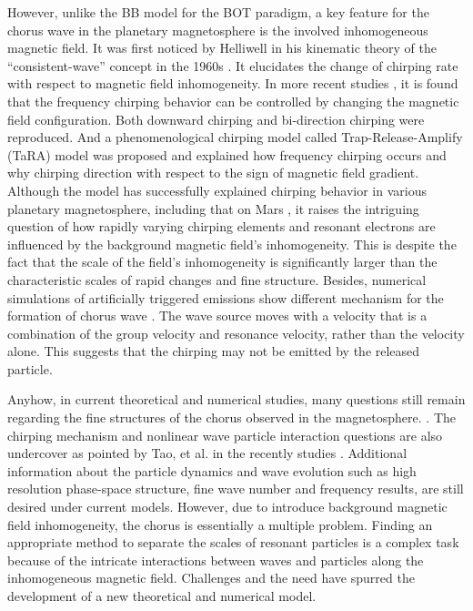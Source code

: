 However, unlike the BB model for the BOT paradigm, a key feature for the chorus wave in the planetary magnetosphere is the involved inhomogeneous magnetic field. 
It was first noticed by Helliwell in his kinematic theory of the ``consistent-wave'' concept in the 1960s \cite{helliwell_theory_1967}.
It elucidates the change of chirping rate with respect to magnetic field inhomogeneity.
In more recent studies \cite{wu_controlling_2020,fujiwara2023}, it is found that the frequency chirping behavior can be controlled by changing the magnetic field configuration. Both downward chirping and bi-direction chirping were reproduced.
And a phenomenological chirping model called Trap-Release-Amplify (TaRA) model was proposed and explained how frequency chirping occurs and why chirping direction with respect to the sign of magnetic field gradient.
Although the model has successfully explained chirping behavior in various planetary magnetosphere, including that on Mars \cite{teng2023}, it raises the intriguing question of how rapidly varying chirping elements and resonant electrons are influenced by the background magnetic field's inhomogeneity. This is despite the fact that the scale of the field's inhomogeneity is significantly larger than the characteristic scales of rapid changes and fine structure.
Besides, numerical simulations of artificially triggered emissions show different mechanism for the formation of chorus wave \cite{nogi2022,nogi2023}. 
The wave source moves with a velocity that is a combination of the group velocity and resonance velocity, rather than the velocity alone. This suggests that the chirping may not be emitted by the released particle.

Anyhow, in current theoretical and numerical studies, many questions still remain regarding the fine structures of the chorus observed in the magnetosphere. \cite{zhang2021}. 
The chirping mechanism and nonlinear wave particle interaction questions are also undercover as pointed by Tao, et al. in the recently studies \cite{tao_theoretical_2020,tao_trap-release-amplify_2021}. Additional information about the particle dynamics and wave evolution such as high resolution phase-space structure, fine wave number and frequency results, are still desired under current models.
However, due to introduce background magnetic field inhomogeneity, the chorus is essentially a multiple problem. 
Finding an appropriate method to separate the scales of resonant particles is a complex task because of the intricate interactions between waves and particles along the inhomogeneous magnetic field. 
Challenges and the need have spurred the development of a new theoretical and numerical model.

